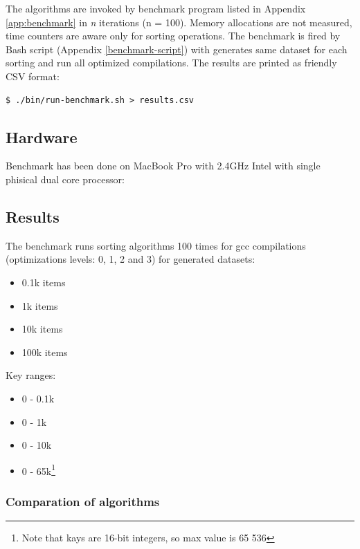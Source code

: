 \documentclass[12pt]{article}
\begin{document}
The algorithms are invoked by benchmark program listed in Appendix \ref{app:benchmark} in \emph{n} iterations (n = 100). Memory allocations are not measured, time counters are aware only for sorting operations. The benchmark is fired by Bash script (Appendix \ref{benchmark-script}) with generates same dataset for each sorting and run all optimized compilations. The results are printed as friendly CSV format:

\begin{lstlisting}
$ ./bin/run-benchmark.sh > results.csv
\end{lstlisting}

\subsection{Hardware}

Benchmark has been done on MacBook Pro with 2.4GHz Intel with single phisical dual core processor:



\subsection{Results}

The benchmark runs sorting algorithms 100 times for gcc compilations (optimizations levels\cite{man-gcc}: 0, 1, 2 and 3) for generated datasets:

\begin{itemize}[noitemsep]
  \item 0.1k items
  \item 1k items
  \item 10k items
  \item 100k items
\end{itemize}

Key ranges:

\begin{itemize}[noitemsep]
  \item 0 - 0.1k
  \item 0 - 1k
  \item 0 - 10k
  \item 0 - 65k\footnote{Note that kays are 16-bit integers, so max value is 65 536}
\end{itemize}

\subsubsection{Comparation of algorithms}
\end{document}
